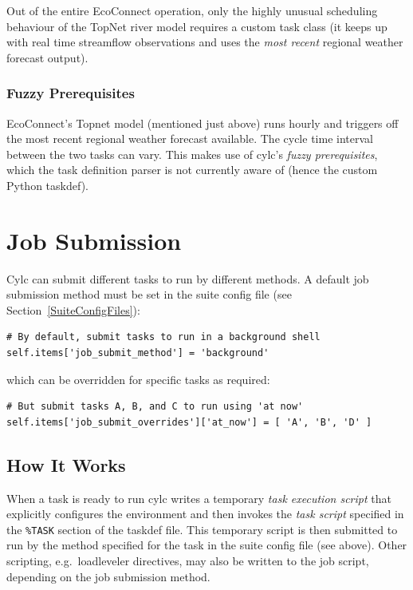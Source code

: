 \documentclass[11pt,a4paper]{article}
\begin{document}
Out of the entire EcoConnect operation, only the highly unusual
scheduling behaviour of the TopNet river model requires a custom task
class (it keeps up with real time streamflow observations and uses
the {\em most recent} regional weather forecast output). 

\subsubsection{Fuzzy Prerequisites}

EcoConnect's Topnet model (mentioned just above) runs hourly and
triggers off the most recent regional weather forecast available.
The cycle time interval between the two tasks can vary. This makes 
use of cylc's {\em fuzzy prerequisites}, which the task definition
parser is not currently aware of (hence the custom Python taskdef).

\pagebreak
\section{Job Submission}
\label{JobSubmission}

Cylc can submit different tasks to run by different methods.  A default
job submission method must be set in the suite config file (see
Section~\ref{SuiteConfigFiles}):
 
\lstset{language=Python}

\begin{lstlisting}
# By default, submit tasks to run in a background shell
self.items['job_submit_method'] = 'background'
\end{lstlisting}
 
which can be overridden for specific tasks as required:

\begin{lstlisting}
# But submit tasks A, B, and C to run using 'at now'
self.items['job_submit_overrides']['at_now'] = [ 'A', 'B', 'D' ]
\end{lstlisting}

\subsection{How It Works}
\label{HowItWorks}

\lstset{language=cylctaskdef}

When a task is ready to run cylc writes a temporary {\em task execution
script} that explicitly configures the environment and then invokes the
{\em task script} specified in the \lstinline=%TASK= section of the
taskdef file. This temporary script is then submitted to run by the
method specified for the task in the suite config file (see above).
Other scripting, e.g.\ loadleveler directives, may also be written to
the job script, depending on the job submission method.
\end{document}
